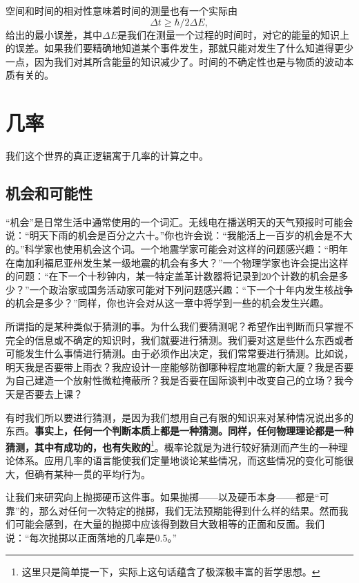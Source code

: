 \documentclass[12pt,oneside]{book}
\renewenvironment{quote}[1][anonymous]
{\def\quoteauthor{#1}
\list{}{\rightmargin\leftmargin %
\itemindent   2em
}\item\relax
\ttfamily}
{\\
\makebox[\linewidth][r]{\sffamily —\quoteauthor}
\endlist}
\begin{document}
空间和时间的相对性意味着时间的测量也有一个实际由
\begin{equation*}
\Delta t\geq\hbar/2\Delta E,
\end{equation*}
给出的最小误差，其中$\Delta E$是我们在测量一个过程的时间时，对它的能量的知识上的误差。如果我们要精确地知道某个事件发生，那就只能对发生了什么知道得更少一点，因为我们对其所含能量的知识减少了。时间的不确定性也是与物质的波动本质有关的。



\chapter{几率}
\begin{quote}[J. C. 麦克斯韦]
我们这个世界的真正逻辑寓于几率的计算之中。
\end{quote}

\section{机会和可能性}
“机会”是日常生活中通常使用的一个词汇。无线电在播送明天的天气预报时可能会说：“明天下雨的机会是百分之六十。”你也许会说：“我能活上一百岁的机会是不大的。”科学家也使用机会这个词。一个地震学家可能会对这样的问题感兴趣：“明年在南加利福尼亚州发生某一级地震的机会有多大？”一个物理学家也许会提出这样的问题：“在下一个十秒钟内，某一特定盖革计数器将记录到20个计数的机会是多少？”一个政治家或国务活动家可能对下列问题感兴趣：“下一个十年内发生核战争的机会是多少？”同样，你也许会对从这一章中将学到一些的机会发生兴趣。

所谓指的是某种类似于猜测的事。为什么我们要猜测呢？希望作出判断而只掌握不完全的信息或不确定的知识时，我们就要进行猜测。我们要对这是些什么东西或者可能发生什么事情进行猜测。由于必须作出决定，我们常常要进行猜测。比如说，明天我是否要带上雨衣？我应设计一座能够防御哪种程度地震的新大厦？我是否要为自己建造一个放射性微粒掩蔽所？我是否要在国际谈判中改变自己的立场？我今天是否要去上课？

有时我们所以要进行猜测，是因为我们想用自己有限的知识来对某种情况说出多的东西。\textbf{事实上，任何一个判断本质上都是一种猜测。同样，任何物理理论都是一种猜测，其中有成功的，也有失败的}\footnote{这里只是简单提一下，实际上这句话蕴含了极深极丰富的哲学思想。}。概率论就是为进行较好猜测而产生的一种理论体系。应用几率的语言能使我们定量地谈论某些情况，而这些情况的变化可能很大，但确有某种一贯的平均行为。

让我们来研究向上抛掷硬币这件事。如果抛掷——以及硬币本身——都是“可靠”的，那么对任何一次特定的抛掷，我们无法预期能得到什么样的结果。然而我们可能会感到，在大量的抛掷中应该得到数目大致相等的正面和反面。我们说：“每次抛掷以正面落地的几率是0.5。”
\end{document}
